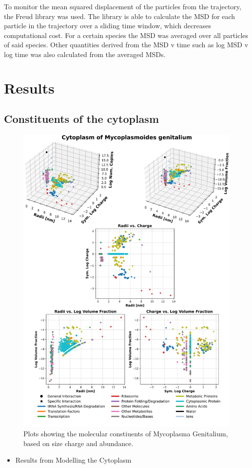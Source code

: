 \documentclass{article}
\begin{document}
To monitor the mean squared displacement of the particles from the trajectory, the Freud library was used. The library is able to calculate the MSD for each particle in the trajectory over a sliding time window, which decreases computational cost. For a certain species the MSD was averaged over all particles of said species. Other quantities derived from the MSD v time such as log MSD v log time was also calculated from the averaged MSDs.

\section{Results}

\subsection{Constituents of the cytoplasm}

\begin{figure}[!htbp]
\centering
\includegraphics[width=0.7\linewidth]{files/Fig1-77a0883bc22d4aa609016ce8a1ec042f.png}
\caption[]{Plots showing the molecular constiuents of Mycoplasma Genitalium, based on size charge and abundance.}
\label{Fig1_OmicsPlot}
\end{figure}

\begin{itemize}
\item Results from Modelling the Cytoplasm
\end{itemize}
\end{document}
